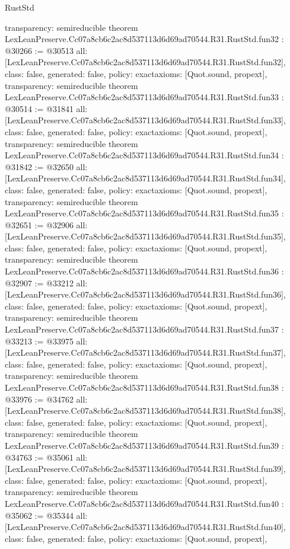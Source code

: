 \begin{lexlean}{RustStd}
\begin{coremodule}
{  transparency: semireducible
}
theorem LexLeanPreserve.Cc07a8cb6c2ac8d537113d6d69ad70544.R31.RustStd.fun32 : @30266 := @30513 {
  all: [LexLeanPreserve.Cc07a8cb6c2ac8d537113d6d69ad70544.R31.RustStd.fun32],
  class: false,
  generated: false,
  policy: exact{axioms: [Quot.sound, propext]},
  transparency: semireducible
}
theorem LexLeanPreserve.Cc07a8cb6c2ac8d537113d6d69ad70544.R31.RustStd.fun33 : @30514 := @31841 {
  all: [LexLeanPreserve.Cc07a8cb6c2ac8d537113d6d69ad70544.R31.RustStd.fun33],
  class: false,
  generated: false,
  policy: exact{axioms: [Quot.sound, propext]},
  transparency: semireducible
}
theorem LexLeanPreserve.Cc07a8cb6c2ac8d537113d6d69ad70544.R31.RustStd.fun34 : @31842 := @32650 {
  all: [LexLeanPreserve.Cc07a8cb6c2ac8d537113d6d69ad70544.R31.RustStd.fun34],
  class: false,
  generated: false,
  policy: exact{axioms: [Quot.sound, propext]},
  transparency: semireducible
}
theorem LexLeanPreserve.Cc07a8cb6c2ac8d537113d6d69ad70544.R31.RustStd.fun35 : @32651 := @32906 {
  all: [LexLeanPreserve.Cc07a8cb6c2ac8d537113d6d69ad70544.R31.RustStd.fun35],
  class: false,
  generated: false,
  policy: exact{axioms: [Quot.sound, propext]},
  transparency: semireducible
}
theorem LexLeanPreserve.Cc07a8cb6c2ac8d537113d6d69ad70544.R31.RustStd.fun36 : @32907 := @33212 {
  all: [LexLeanPreserve.Cc07a8cb6c2ac8d537113d6d69ad70544.R31.RustStd.fun36],
  class: false,
  generated: false,
  policy: exact{axioms: [Quot.sound, propext]},
  transparency: semireducible
}
theorem LexLeanPreserve.Cc07a8cb6c2ac8d537113d6d69ad70544.R31.RustStd.fun37 : @33213 := @33975 {
  all: [LexLeanPreserve.Cc07a8cb6c2ac8d537113d6d69ad70544.R31.RustStd.fun37],
  class: false,
  generated: false,
  policy: exact{axioms: [Quot.sound, propext]},
  transparency: semireducible
}
theorem LexLeanPreserve.Cc07a8cb6c2ac8d537113d6d69ad70544.R31.RustStd.fun38 : @33976 := @34762 {
  all: [LexLeanPreserve.Cc07a8cb6c2ac8d537113d6d69ad70544.R31.RustStd.fun38],
  class: false,
  generated: false,
  policy: exact{axioms: [Quot.sound, propext]},
  transparency: semireducible
}
theorem LexLeanPreserve.Cc07a8cb6c2ac8d537113d6d69ad70544.R31.RustStd.fun39 : @34763 := @35061 {
  all: [LexLeanPreserve.Cc07a8cb6c2ac8d537113d6d69ad70544.R31.RustStd.fun39],
  class: false,
  generated: false,
  policy: exact{axioms: [Quot.sound, propext]},
  transparency: semireducible
}
theorem LexLeanPreserve.Cc07a8cb6c2ac8d537113d6d69ad70544.R31.RustStd.fun40 : @35062 := @35344 {
  all: [LexLeanPreserve.Cc07a8cb6c2ac8d537113d6d69ad70544.R31.RustStd.fun40],
  class: false,
  generated: false,
  policy: exact{axioms: [Quot.sound, propext]},
}
\end{coremodule}
\end{lexlean}
